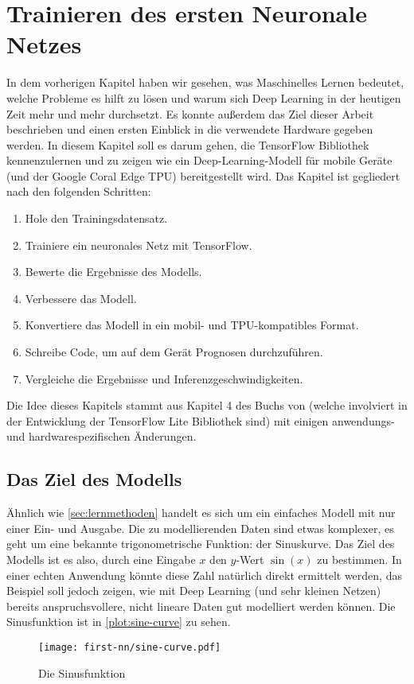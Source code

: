 \chapter{Trainieren des ersten Neuronale Netzes}
In dem vorherigen Kapitel haben wir gesehen,
was Maschinelles Lernen bedeutet, welche
Probleme es hilft zu lösen und warum sich
Deep Learning in der heutigen Zeit mehr und mehr durchsetzt.
Es konnte außerdem das Ziel dieser Arbeit
beschrieben und einen ersten Einblick
in die verwendete Hardware gegeben werden.
In diesem Kapitel soll es darum gehen, die
TensorFlow Bibliothek kennenzulernen
und zu zeigen wie ein Deep-Learning-Modell
für mobile Geräte (und der Google Coral Edge TPU) bereitgestellt wird.
Das Kapitel ist gegliedert nach den folgenden Schritten:
\begin{enumerate}
  \item Hole den Trainingsdatensatz.
  \item Trainiere ein neuronales Netz mit TensorFlow.
  \item Bewerte die Ergebnisse des Modells.
  \item Verbessere das Modell.
  \item Konvertiere das Modell in ein mobil- und TPU-kompatibles Format.
  \item Schreibe Code, um auf dem Gerät Prognosen durchzuführen.
  \item Vergleiche die Ergebnisse und Inferenzgeschwindigkeiten.
\end{enumerate}
Die Idee dieses Kapitels stammt aus Kapitel 4 des Buchs 
von \textcite{book:tiny-ml} (welche involviert in der Entwicklung
der TensorFlow Lite Bibliothek sind) mit einigen
anwendungs- und hardwarespezifischen Änderungen.

\section{Das Ziel des Modells}
Ähnlich wie \autoref{sec:lernmethoden} handelt es sich
um ein einfaches Modell mit nur einer Ein- und Ausgabe.
Die zu modellierenden Daten sind etwas komplexer,
es geht um eine bekannte trigonometrische Funktion: der Sinuskurve.
Das Ziel des Modells ist es also, durch eine Eingabe $x$
den $y$-Wert $\sin(x)$ zu bestimmen.
In einer echten Anwendung könnte
diese Zahl natürlich direkt ermittelt werden,
das Beispiel soll jedoch zeigen,
wie mit Deep Learning (und sehr kleinen Netzen)
bereits anspruchsvollere, nicht lineare Daten gut modelliert werden können.
Die Sinusfunktion ist in \autoref{plot:sine-curve} zu sehen.
\begin{figure}[h!]
  \centering
  \texttt{[image: first-nn/sine-curve.pdf]}
  \caption{Die Sinusfunktion}
  \label{plot:sine-curve}
\end{figure}

